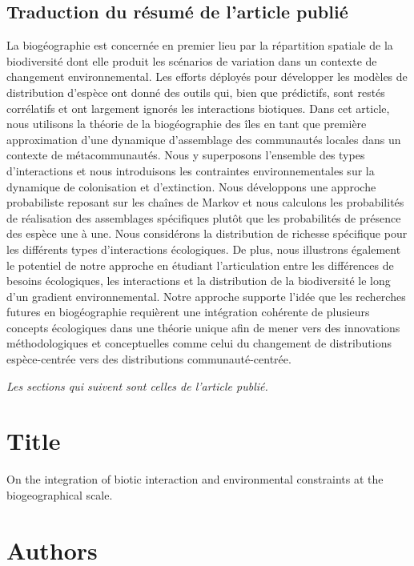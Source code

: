 \subsection{Traduction du résumé de l'article publié}

La biogéographie est concernée en premier lieu par la répartition spatiale de la biodiversité dont elle produit les scénarios de variation dans un contexte de changement environnemental.
Les efforts déployés pour développer les modèles de distribution d'espèce ont donné des outils qui, bien que prédictifs, sont restés corrélatifs et ont largement ignorés les interactions biotiques.
Dans cet article, nous utilisons la théorie de la biogéographie des îles en tant que première approximation d'une dynamique d'assemblage des communautés locales dans un contexte de métacommunautés.
Nous y superposons l'ensemble des types d'interactions et nous introduisons les contraintes environnementales sur la dynamique de colonisation et d'extinction.
Nous développons une approche probabiliste reposant sur les chaînes de Markov et nous calculons les probabilités de réalisation des assemblages spécifiques plutôt que les probabilités de présence des espèce une à une.
Nous considérons la distribution de richesse spécifique pour les différents types d'interactions écologiques.
De plus, nous illustrons également le potentiel de notre approche en étudiant l'articulation entre les différences de besoins écologiques, les interactions et la distribution de la biodiversité le long d'un gradient environnemental.
Notre approche supporte l'idée que les recherches futures en biogéographie requièrent une intégration cohérente de plusieurs concepts écologiques dans une théorie unique afin de mener vers des innovations méthodologiques et conceptuelles comme celui du changement de distributions espèce-centrée vers des distributions communauté-centrée.


\emph{Les sections qui suivent sont celles de l'article publié.}





\section{Title}

On the integration of biotic interaction and environmental constraints at the biogeographical scale.

\section{Authors}

